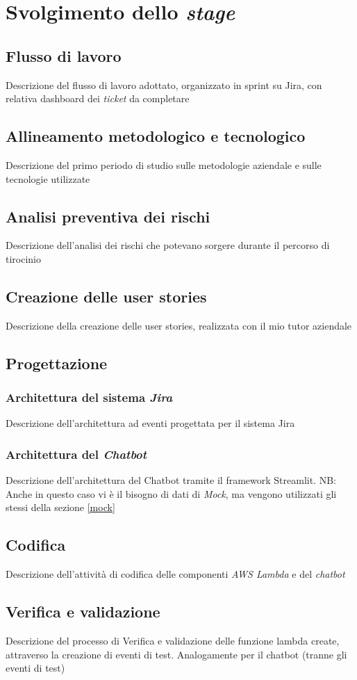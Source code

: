 \chapter{Svolgimento dello \textit{stage}}
\label{cap:descrizione-stage}

\section{Flusso di lavoro}
Descrizione del flusso di lavoro adottato, organizzato in sprint su Jira, con relativa dashboard dei \textit{ticket} da completare
\section{Allineamento metodologico e tecnologico}
Descrizione del primo periodo di studio sulle metodologie aziendale e sulle tecnologie utilizzate
\section{Analisi preventiva dei rischi}
Descrizione dell'analisi dei rischi che potevano sorgere durante il percorso di tirocinio
\section{Creazione delle user stories}
Descrizione della creazione delle user stories, realizzata con il mio tutor aziendale

\section{Progettazione}
\subsection{Architettura del sistema \textit{Jira}}
Descrizione dell'architettura ad eventi progettata per il sistema Jira
\subsection{Architettura del \textit{Chatbot}}
Descrizione dell'architettura del Chatbot tramite il framework Streamlit.
NB: Anche in questo caso vi è il bisogno di dati di \textit{Mock}, ma vengono utilizzati gli stessi della sezione \ref{mock}
\section{Codifica}
Descrizione dell'attività di codifica delle componenti \textit{AWS Lambda} e del \textit{chatbot}
\section{Verifica e validazione}
Descrizione del processo di Verifica e validazione delle funzione lambda create, attraverso la creazione di eventi di test.
Analogamente per il chatbot (tranne gli eventi di test)
